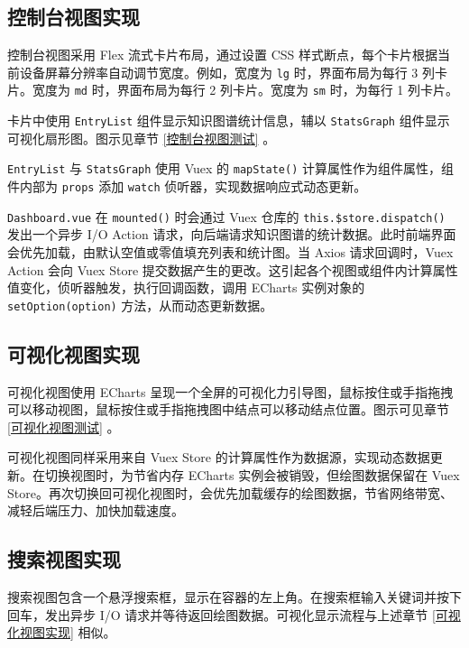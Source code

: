 \documentclass[a4paper,AutoFakeBold,oneside,12pt]{book}
\begin{document}
\subsection{控制台视图实现\label{控制台视图实现}}

控制台视图采用 Flex 流式卡片布局，通过设置 CSS 样式断点，每个卡片根据当前设备屏幕分辨率自动调节宽度。例如，宽度为 \lstinline|lg| 时，界面布局为每行 3 列卡片。宽度为 \lstinline|md| 时，界面布局为每行 2 列卡片。宽度为 \lstinline|sm| 时，为每行 1 列卡片。

卡片中使用 \lstinline|EntryList| 组件显示知识图谱统计信息，辅以 \lstinline|StatsGraph| 组件显示可视化扇形图。图示见章节 \ref{控制台视图测试} 。

\lstinline|EntryList| 与 \lstinline|StatsGraph| 使用 Vuex 的 \lstinline|mapState()| 计算属性作为组件属性，组件内部为 \lstinline|props| 添加 \lstinline|watch| 侦听器，实现数据响应式动态更新。

\lstinline|Dashboard.vue| 在 \lstinline|mounted()| 时会通过 Vuex 仓库的 \lstinline|this.$store.dispatch()| 发出一个异步 I/O Action 请求，向后端请求知识图谱的统计数据。此时前端界面会优先加载，由默认空值或零值填充列表和统计图。当 Axios 请求回调时，Vuex Action 会向 Vuex Store 提交数据产生的更改。这引起各个视图或组件内计算属性值变化，侦听器触发，执行回调函数，调用 ECharts 实例对象的 \lstinline|setOption(option)| 方法，从而动态更新数据。

\subsection{可视化视图实现\label{可视化视图实现}}

可视化视图使用 ECharts 呈现一个全屏的可视化力引导图，鼠标按住或手指拖拽可以移动视图，鼠标按住或手指拖拽图中结点可以移动结点位置。图示可见章节 \ref{可视化视图测试} 。

可视化视图同样采用来自 Vuex Store 的计算属性作为数据源，实现动态数据更新。在切换视图时，为节省内存 ECharts 实例会被销毁，但绘图数据保留在 Vuex Store。再次切换回可视化视图时，会优先加载缓存的绘图数据，节省网络带宽、减轻后端压力、加快加载速度。

\subsection{搜索视图实现}

搜索视图包含一个悬浮搜索框，显示在容器的左上角。在搜索框输入关键词并按下回车，发出异步 I/O 请求并等待返回绘图数据。可视化显示流程与上述章节 \ref{可视化视图实现} 相似。
\end{document}
